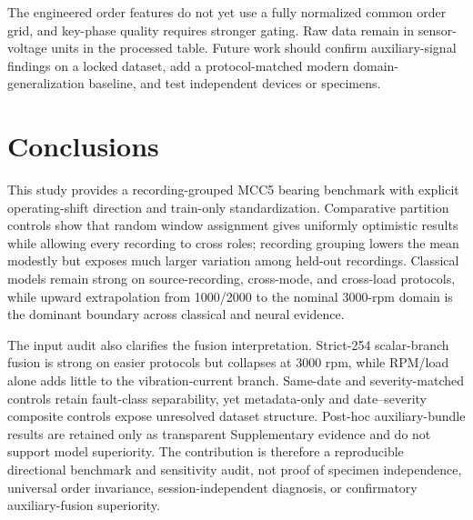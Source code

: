 \documentclass[machines,article,submit,oneauthor]{Definitions/mdpi}
\begin{document}
The engineered order features do not yet use a fully normalized common order grid, and key-phase quality requires stronger gating. Raw data remain in sensor-voltage units in the processed table. Future work should confirm auxiliary-signal findings on a locked dataset, add a protocol-matched modern domain-generalization baseline, and test independent devices or specimens.

\section{Conclusions}
This study provides a recording-grouped MCC5 bearing benchmark with explicit operating-shift direction and train-only standardization. Comparative partition controls show that random window assignment gives uniformly optimistic results while allowing every recording to cross roles; recording grouping lowers the mean modestly but exposes much larger variation among held-out recordings. Classical models remain strong on source-recording, cross-mode, and cross-load protocols, while upward extrapolation from 1000/2000 to the nominal 3000-rpm domain is the dominant boundary across classical and neural evidence.

The input audit also clarifies the fusion interpretation. Strict-254 scalar-branch fusion is strong on easier protocols but collapses at 3000 rpm, while RPM/load alone adds little to the vibration-current branch. Same-date and severity-matched controls retain fault-class separability, yet metadata-only and date--severity composite controls expose unresolved dataset structure. Post-hoc auxiliary-bundle results are retained only as transparent Supplementary evidence and do not support model superiority. The contribution is therefore a reproducible directional benchmark and sensitivity audit, not proof of specimen independence, universal order invariance, session-independent diagnosis, or confirmatory auxiliary-fusion superiority.


\end{document}
